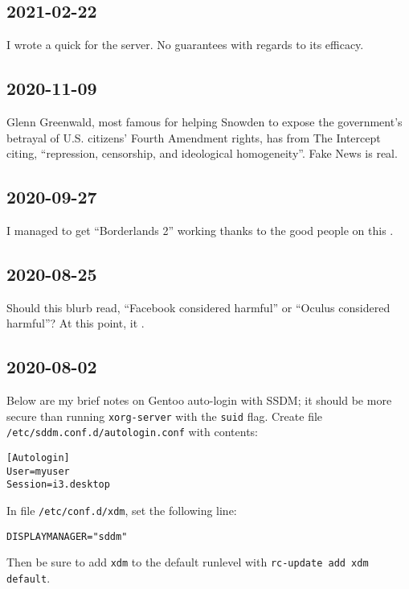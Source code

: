 \documentclass{article}
\begin{document}
\subsection{2021-02-22}
I wrote a quick  for the  server.  No guarantees with regards to its efficacy.

\subsection{2020-11-09}
Glenn Greenwald, most famous for helping Snowden to expose the government's betrayal of U.S. citizens' Fourth Amendment rights, has  from The Intercept citing, ``repression, censorship, and ideological homogeneity''.  Fake News is real.

\subsection{2020-09-27}
I managed to get ``Borderlands 2'' working thanks to the good people on this .

\subsection{2020-08-25}
Should this blurb read, ``Facebook considered harmful'' or ``Oculus considered harmful''?  At this point, it .

\subsection{2020-08-02}
Below are my brief notes on Gentoo auto-login with SSDM; it should be more secure than running \texttt{xorg-server} with the \texttt{suid} flag.  Create file \texttt{/etc/sddm.conf.d/autologin.conf} with contents:
\begin{verbatim}
[Autologin]
User=myuser
Session=i3.desktop
\end{verbatim}
In file \texttt{/etc/conf.d/xdm}, set the following line:
\begin{verbatim}
DISPLAYMANAGER="sddm"
\end{verbatim}
Then be sure to add \texttt{xdm} to the default runlevel with \texttt{rc-update add xdm default}.
\end{document}
